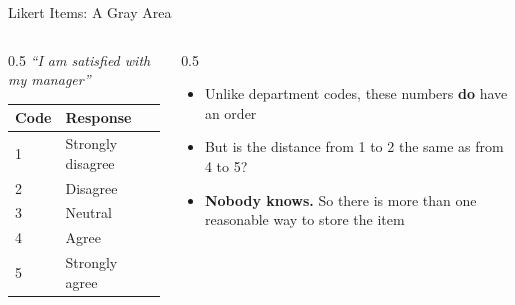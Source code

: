 \documentclass[
  ignorenonframetext,
  aspectratio=169,
]{beamer}
\providecommand{\tightlist}{%
  \setlength{\itemsep}{0pt}\setlength{\parskip}{0pt}}\usepackage{longtable,booktabs,array}
\begin{document}
\begin{frame}{Likert Items: A Gray Area}
\protect\hypertarget{sec-likert}{}
\begin{columns}[T]
\begin{column}{0.5\textwidth}
\emph{``I am satisfied with my manager''}

\begin{longtable}[]{@{}ll@{}}
\toprule()
Code & Response \\
\midrule()
\endhead
1 & Strongly disagree \\
2 & Disagree \\
3 & Neutral \\
4 & Agree \\
5 & Strongly agree \\
\bottomrule()
\end{longtable}
\end{column}

\begin{column}{0.5\textwidth}
\begin{itemize}
\tightlist
\item
  Unlike department codes, these numbers \textbf{do} have an order
\item
  But is the distance from 1 to 2 the same as from 4 to 5?
\item
  \textbf{Nobody knows.} So there is more than one reasonable way to
  store the item
\end{itemize}
\end{column}
\end{columns}
\end{frame}
\end{document}
